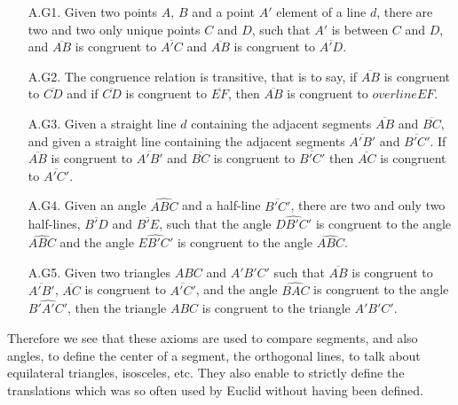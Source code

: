 	\begin{enumerate}
		\item[A.G1.] Given two points $A$, $B$ and a point $A'$ element of a line $d$, there are two and two only unique points $C$ and $D$, such that $A'$ is between $C$ and $D$, and $\overline{AB}$ is congruent to $\overline{A'C}$ and $\overline{AB}$ is congruent to $\overline{A'D}$.
	
		\item[A.G2.] The congruence relation is transitive, that is to say, if $\overline{AB}$ is congruent to $\overline{CD}$ and if $\overline{CD}$ is congruent to $\overline{EF}$, then $\overline{AB}$ is congruent to $overline{EF}$.	

		\item[A.G3.] Given a straight line $d$ containing the adjacent segments $\overline{AB}$ and $\overline{BC}$, and given a straight line containing the adjacent segments $\overline{A'B'}$ and $\overline{B'C'}$. If $\overline{AB}$ is congruent to $\overline{A'B'}$ and $\overline{BC}$ is congruent to $\overline{B'C'}$ then $\overline{AC}$ is congruent to $\overline{A'C'}$.	

		\item[A.G4.] Given an angle $\widehat{ABC}$ and a half-line $\overline{B'C'}$, there are two and only two half-lines, $\overline{B'D}$ and $\overline{B'E}$, such that the angle $\widehat{DB'C'}$ is congruent to the angle $\widehat{ABC}$ and the angle $\widehat{EB'C'}$ is congruent to the angle $\widehat{ABC}$.
 	
		\item[A.G5.] Given two triangles $ABC$ and $A'B'C'$ such that $\overline{AB}$ is congruent to $\overline{A'B'}$, $\overline{AC}$ is congruent to $\overline{A'C'}$, and the angle $\widehat{BAC}$ is congruent to the angle $\widehat{B'A'C'}$, then the triangle $ABC$ is congruent to the triangle $A'B'C'$.
	\end{enumerate}
	Therefore we see that these axioms are used to compare segments, and also angles, to define the center of a segment, the orthogonal lines, to talk about equilateral triangles, isosceles, etc. They also enable to strictly define the translations which was so often used by Euclid without having been defined.

